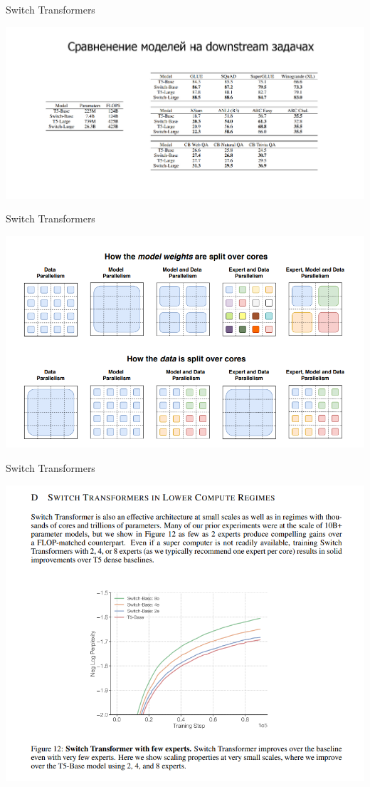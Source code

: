 \documentclass[aspectratio=169,xcolor=dvipsnames]{beamer}
\begin{document}
\begin{frame}{Switch Transformers}
\begin{center}
\vspace*{-0.5cm}
\includegraphics[scale=0.25]{st4.jpg}    
\end{center} 
\end{frame}

\begin{frame}{Switch Transformers}
\begin{center}
\vspace*{-0.5cm}
\includegraphics[scale=0.5]{st5.png}    
\end{center} 
\end{frame}

\begin{frame}{Switch Transformers}
\begin{center}
\vspace*{-0.5cm}
\includegraphics[scale=0.3]{st6.png}    
\end{center} 
\end{frame}
\end{document}
